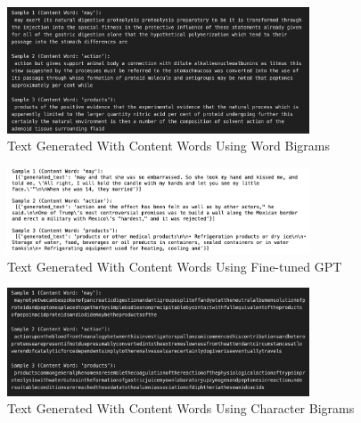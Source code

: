\documentclass[journal,onecolumn]{IEEEtran}
\begin{document}
\begin{figure}[H]
    \centering
    \includegraphics[width=0.8\textwidth]{WordBigrams/ContentWords_Bigram.png} %
    \caption{Text Generated With Content Words Using Word Bigrams}
    \label{fig:example_result}
\end{figure}

\begin{figure}[H]
    \centering
    \includegraphics[width=0.8\textwidth]{GPT/ContentWords_GPT.png} %
    \caption{Text Generated With Content Words Using Fine-tuned GPT}
    \label{fig:example_result}
\end{figure}

\begin{figure}[H]
    \centering
    \includegraphics[width=0.8\textwidth]{CharacterBigrams/ContentWords_CharBigrams.png} %
    \caption{Text Generated With Content Words Using Character Bigrams}
    \label{fig:example_result}
\end{figure}


\end{document}
